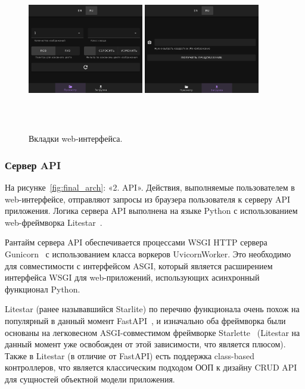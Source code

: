 \documentclass[a4paper,12pt]{extarticle}
\begin{document}
\begin{figure}[ht]
	\centering
	\includegraphics[width=0.45\textwidth,height=6.5cm]{tab_browse.png}
	\includegraphics[width=0.45\textwidth,height=6.5cm]{tab_upload.png}
	\caption{Вкладки web-интерфейса.}
	\label{fig:tabs}
\end{figure}

\subsubsection{Сервер API}

На рисунке~\ref{fig:final_arch}: «2. API». Действия, выполняемые пользователем в web-интерфейсе,
отправляют запросы из браузера пользователя к серверу API приложения. Логика сервера API выполнена
на языке Python с использованием web-фреймворка Litestar~\cite{litestar}.\par

Рантайм сервера API обеспечивается процессами WSGI HTTP сервера Gunicorn~\cite{gunicorn} с
использованием класса воркеров UvicornWorker. Это необходимо для совместимости с интерфейсом ASGI,
который является расширением интерфейса WSGI для web-приложений, использующих асинхронный функционал
Python.

Litestar (ранее называвшийся Starlite) по перечню функционала очень похож на популярный в данный
момент FastAPI~\cite{fastapi}, и изначально оба фреймворка были основаны на легковесном
ASGI-совместимом фреймворке Starlette~\cite{starlette} (Litestar на данный момент уже освобожден от
этой зависимости, что является плюсом). Также в Litestar (в отличие от FastAPI) есть поддержка
class-based контроллеров, что является классическим подходом ООП к дизайну CRUD API для сущностей
объектной модели приложения.
\end{document}
